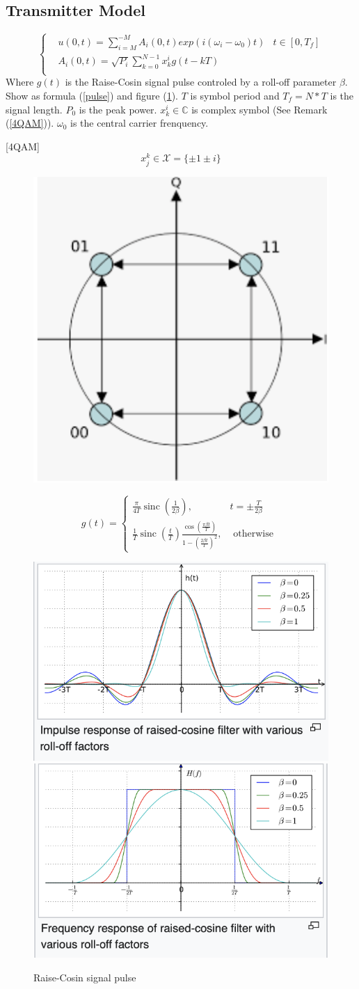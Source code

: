 \subsection{Transmitter Model}

\begin{equation}\label{Tx}
\left\{
\begin{aligned}
& u(0,t) = \sum_{i=M}^{-M} A_i(0,t) exp(i (\omega_i - \omega_0) t) & t\in [0,T_f]\\
& A_i(0,t) = \sqrt{P_i}\sum_{k=0}^{N-1} x^i_k g(t - kT) \\
\end{aligned}
\right.
\end{equation}
Where $g(t)$ is the Raise-Cosin signal pulse controled by a roll-off parameter $\beta$. Show as formula (\ref{pulse}) and figure (\ref{Raise-Cosin}). $T$ is symbol period and $T_f = N*T$ is the signal length. $P_0$ is the peak power. $x^i_k \in \mathbb{C}$ is complex symbol (See Remark (\ref{4QAM})). $\omega_0$ is the central carrier frenquency.

\begin{remark}\label{4QAM}
[4QAM]
$$
x^k_j \in \mathcal{X} = \{\pm 1 \pm i \}
$$
\begin{figure}[htbp]
\centering
\includegraphics[width=0.2\linewidth]{img/4QAM.png}
\end{figure}
\end{remark}

\begin{equation}\label{pulse}
g(t)=\left\{\begin{array}{ll}
\frac{\pi}{4 T} \operatorname{sinc}\left(\frac{1}{2 \beta}\right), & t=\pm \frac{T}{2 \beta} \\
\frac{1}{T} \operatorname{sinc}\left(\frac{t}{T}\right) \frac{\cos \left(\frac{\pi \beta t}{T}\right)}{1-\left(\frac{2 \beta t}{T}\right)^{2}}, & \text { otherwise }
\end{array}\right.
\end{equation}

\begin{figure}[htbp]
\centering
\includegraphics[width=0.3\linewidth]{img/rc_t.png}
\includegraphics[width=0.3\linewidth]{img/rc_f.png}
\caption{Raise-Cosin signal pulse}
\label{Raise-Cosin}
\end{figure}



